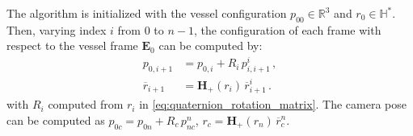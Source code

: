 \begin{algorithm}
The algorithm is initialized with the vessel configuration $p_{00} \in \mathbb{R}^3$ and $r_0 \in \mathbb{H}^*$. 
Then, varying index $i$ from $0$ to $n-1$, the configuration of each frame with respect to the vessel frame $\mathbf{E}_0$ can be computed by:
%
%
\begin{align}
p_{0,i+1} &= p_{0,i} + R_{i} \, p^i_{i,i+1} \,, \\
\overline{r}_{i+1} &= \mathbf{H}_+(r_i) \, \overline{r}^i_{i+1} \,.
\end{align}
%
with $R_i$ computed from $r_i$ in \eqref{eq:quaternion_rotation_matrix}.
The camera pose can be computed as $p_{0c} = p_{0n} + R_{c} \, p^n_{nc}$, $r_c = \mathbf{H}_+(r_n) \, \overline{r}^n_{c}$.
%
\end{algorithm}


